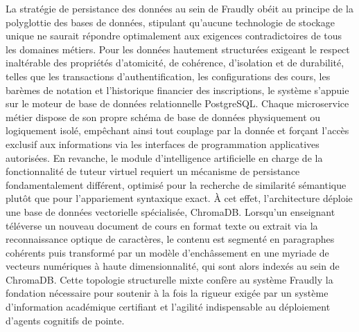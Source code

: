 La stratégie de persistance des données au sein de Fraudly obéit au principe de la polyglottie des bases de données, stipulant qu'aucune technologie de stockage unique ne saurait répondre optimalement aux exigences contradictoires de tous les domaines métiers. Pour les données hautement structurées exigeant le respect inaltérable des propriétés d'atomicité, de cohérence, d'isolation et de durabilité, telles que les transactions d'authentification, les configurations des cours, les barèmes de notation et l'historique financier des inscriptions, le système s'appuie sur le moteur de base de données relationnelle PostgreSQL. Chaque microservice métier dispose de son propre schéma de base de données physiquement ou logiquement isolé, empêchant ainsi tout couplage par la donnée et forçant l'accès exclusif aux informations via les interfaces de programmation applicatives autorisées. En revanche, le module d'intelligence artificielle en charge de la fonctionnalité de tuteur virtuel requiert un mécanisme de persistance fondamentalement différent, optimisé pour la recherche de similarité sémantique plutôt que pour l'appariement syntaxique exact. À cet effet, l'architecture déploie une base de données vectorielle spécialisée, ChromaDB. Lorsqu'un enseignant téléverse un nouveau document de cours en format texte ou extrait via la reconnaissance optique de caractères, le contenu est segmenté en paragraphes cohérents puis transformé par un modèle d'enchâssement en une myriade de vecteurs numériques à haute dimensionnalité, qui sont alors indexés au sein de ChromaDB. Cette topologie structurelle mixte confère au système Fraudly la fondation nécessaire pour soutenir à la fois la rigueur exigée par un système d'information académique certifiant et l'agilité indispensable au déploiement d'agents cognitifs de pointe.
